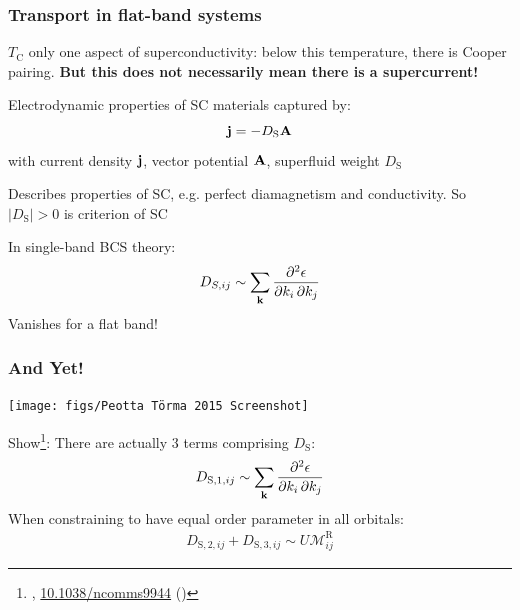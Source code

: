 \documentclass[aspectratio=169]{beamer}
\begin{document}
\begin{frame}
	\frametitle{Transport in flat-band systems}
	
	\(T_{\textrm{C}}\) only one aspect of superconductivity: below this temperature, there is Cooper pairing.
	\textbf{But this does not necessarily mean there is a supercurrent!}
	
	Electrodynamic properties of SC materials captured by:
	\begin{equation}
		\mathbf{j} = -D_{\textrm{S}} \mathbf{A}
	\end{equation}
	with current density \(\mathbf{j}\), vector potential \(\mathbf{A}\), superfluid weight \(D_{\textrm{S}}\)
	
	Describes properties of SC, e.g. perfect diamagnetism and conductivity.
	So \(\vert D_{\textrm{S}} \vert > 0\) is criterion of SC
	
	In single-band BCS theory:
	\begin{equation}
		D_{S, ij} \sim \sum_{\mathbf{k}} \pdv{\epsilon}{k_i,k_j}
	\end{equation}
	Vanishes for a flat band!
\end{frame}


\begin{frame}
	\frametitle{And Yet!}
	
	\begin{center}
		\texttt{[image: figs/Peotta Törma 2015 Screenshot]}
	\end{center}
	
	Show\footnote[frame]{\footnotesize \citeauthor{peottaSuperfluidityTopologicallyNontrivial2015}, \href{https://doi.org/10.1038/ncomms9944}{10.1038/ncomms9944} (\citeyear{peottaSuperfluidityTopologicallyNontrivial2015})}: There are actually 3 terms comprising \(D_{\textrm{S}}\):
	\begin{align}
		D_{\textrm{S}, 1, ij} \sim \sum_{\mathbf{k}} \pdv{\epsilon}{k_i,k_j}
	\end{align}
	When constraining to have equal order parameter in all orbitals:
	\begin{align}
		D_{\textrm{S}, 2, ij} + D_{\textrm{S}, 3, ij} \sim U \mathcal{M}_{ij}^{\textrm{R}}
	\end{align}
\end{frame}
\end{document}
